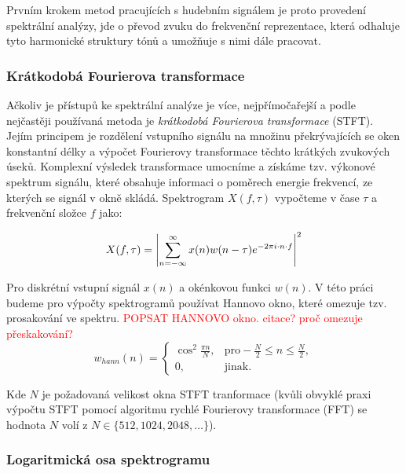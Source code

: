 Prvním krokem metod pracujících s hudebním signálem je proto provedení spektrální analýzy, jde o převod zvuku do frekvenční reprezentace, která odhaluje tyto harmonické struktury tónů a umožňuje s nimi dále pracovat. 

\subsubsection{Krátkodobá Fourierova transformace}

Ačkoliv je přístupů ke spektrální analýze je více, nejpřímočařejší a podle \cite{Dressler2016} nejčastěji používaná metoda je \emph{krátkodobá Fourierova transformace} (STFT). Jejím principem je rozdělení vstupního signálu na množinu překrývajících se oken konstantní délky a výpočet Fourierovy transformace těchto krátkých zvukových úseků. Komplexní výsledek transformace umocníme a získáme tzv. výkonové spektrum signálu, které obsahuje informaci o poměrech energie frekvencí, ze kterých se signál v okně skládá. Spektrogram $X(f, \tau)$ vypočteme v čase $\tau$ a frekvenční složce $f$ jako:


$$ X(f, \tau) = \left|{\sum^{\infty}_{n=-\infty}{x(n)w(n-\tau)e^{-2\pi i \cdot n \cdot f}}}\right|^2 $$

Pro diskrétní vstupní signál $x(n)$ a okénkovou funkci $w(n)$. V této práci budeme pro výpočty spektrogramů používat Hannovo okno, které omezuje tzv. prosakování ve spektru. 
\textcolor{red}{POPSAT HANNOVO okno. citace? proč omezuje přeskakování?}
\[
w_{hann}(n) =
\begin{cases}
    \cos^2{\frac{\pi n}{N}}, & \text{pro} -\frac{N}{2} \leq n \leq \frac{N}{2},\\
    0, & \text{jinak}.
\end{cases}
\]

Kde $N$ je požadovaná velikost okna STFT tranformace (kvůli obvyklé praxi výpočtu STFT pomocí algoritmu rychlé Fourierovy transformace (FFT) se hodnota $N$ volí z $N \in \{512, 1024, 2048, \dots\}$).

\subsubsection{Logaritmická osa spektrogramu}

